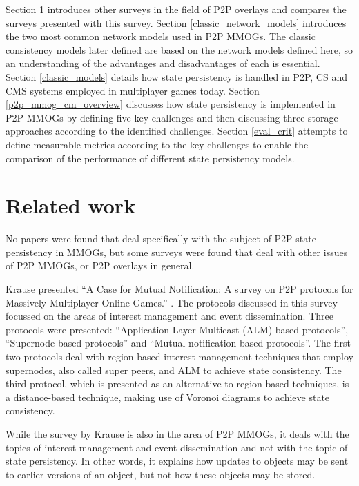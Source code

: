 \documentclass[10pt,a4paper,journal,cspaper,compsoc]{IEEEtran}
\begin{document}
Section \ref{related_work} introduces other surveys in the field of P2P overlays and compares the surveys presented with this survey.
%
Section \ref{classic_network_models} introduces the two most common network models used in P2P MMOGs. The classic consistency models later defined
are based on the network models defined here, so an understanding of the advantages and disadvantages of each is essential.
%
Section \ref{classic_models} details how state persistency is handled in P2P, \ac{CS} and \ac{CMS} systems employed in multiplayer games today.
%
Section \ref{p2p_mmog_cm_overview} discusses how state persistency is implemented in P2P MMOGs by defining five key challenges and then discussing
three storage approaches according to the identified challenges.
%
Section \ref{eval_crit} attempts to define measurable metrics according to the key challenges to enable the comparison of the performance of
different state persistency models.

\section{Related work}
\label{related_work}

No papers were found that deal specifically with the subject of P2P state persistency in MMOGs, but some surveys were found that deal with other
issues of P2P MMOGs, or P2P overlays in general.

Krause presented ``A Case for Mutual Notification: A survey on P2P protocols for Massively Multiplayer Online Games.''
\cite{IM_and_ED_survey_Krause}. The protocols discussed in this survey focussed on the areas of interest management and event dissemination. Three
protocols were presented: ``Application Layer Multicast (ALM) based protocols'', ``Supernode based protocols'' and ``Mutual notification based
protocols''. The first two protocols deal with region-based interest management techniques that employ supernodes, also called super peers, and ALM
to achieve state consistency. The third protocol, which is presented as an alternative to region-based techniques, is a distance-based technique,
making use of Voronoi diagrams to achieve state consistency.

While the survey by Krause is also in the area of P2P MMOGs, it deals with the topics of interest management and event dissemination and not with the
topic of state persistency. In other words, it explains how updates to objects may be sent to earlier versions of an object, but not how these
objects may be stored.
\end{document}

